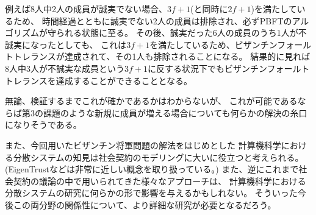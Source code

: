 例えば8人中2人の成員が誠実でない場合、$3f+1$(と同時に$2f+1$)を満たしているため、
時間経過とともに誠実でない2人の成員は排除され、必ずPBFTのアルゴリズムが守られる状態に至る。
その後、誠実だった6人の成員のうち1人が不誠実になったとしても、
これは$3f+1$を満たしているため、ビザンチンフォールトトレランスが達成されて、その1人も排除されることになる。
結果的に見れば8人中3人が不誠実な成員という$3f+1$に反する状況下でもビザンチンフォールトトレランスを達成することができることとなる。

無論、検証するまでこれが確かであるかはわからないが、
これが可能であるならば第3の課題のような新規に成員が増える場合についても何らかの解決の糸口になりそうである。

また、今回用いたビザンチン将軍問題の解法をはじめとした
計算機科学における分散システムの知見は社会契約のモデリングに大いに役立つと考えられる。
(EigenTrust\cite{kamvar2003}などは非常に近しい概念を取り扱っている。)
また、逆にこれまで社会契約の議論の中で用いられてきた様々なアプローチは、
計算機科学における分散システムの研究に何らかの形で影響を与えるかもしれない。
そういった今後この両分野の関係性について、より詳細な研究が必要となるだろう。
